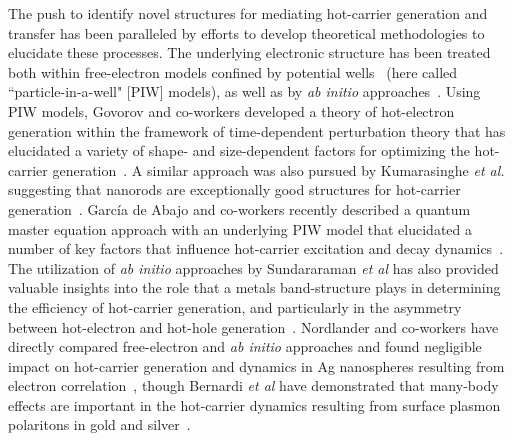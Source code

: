 \documentclass[journal=jpclcd,manuscript=letter]{achemso}
\begin{document}
The push to identify novel structures for mediating hot-carrier generation and transfer has been paralleled by 
efforts to develop theoretical methodologies to elucidate these processes.  The underlying electronic
structure has been treated both within free-electron models confined by potential wells~\cite{GZG_JPCC_2013,ZG_JPCC_2014,MLK_ACSNano_2014,KPB_SciRep_2015,SAG_ACSPhotonics_2016} (here called
``particle-in-a-well" [PIW] models), as well as by {\it ab initio} approaches~\cite{SNJ_NatComm_2014,BMN_NatComm_2015,MWW_NatComm_2015,BSN_ACSNano_2016}.
Using PIW models, Govorov and co-workers developed a theory of 
hot-electron generation within the framework of time-dependent perturbation theory that
has elucidated a variety of shape- and size-dependent factors for optimizing 
the hot-carrier generation~\cite{GZG_JPCC_2013,ZG_JPCC_2014}.  A similar approach was also pursued by Kumarasinghe {\it et al.} suggesting
that nanorods are exceptionally good structures for hot-carrier generation~\cite{KPB_SciRep_2015}.  Garc\'ia de Abajo and co-workers recently described a 
quantum master equation approach with an underlying PIW model that elucidated a number of key factors that influence
hot-carrier excitation and decay dynamics~\cite{SAG_ACSPhotonics_2016}.  The utilization of {\it ab initio} approaches by Sundararaman {\it et al} 
has also provided valuable insights into the role that a metals band-structure plays
in determining the efficiency of hot-carrier generation, and particularly in the asymmetry between hot-electron
and hot-hole generation~\cite{SNJ_NatComm_2014}.  Nordlander and co-workers have directly compared free-electron and {\it ab initio} approaches
and found negligible impact on hot-carrier generation and dynamics in Ag nanospheres resulting from electron correlation~\cite{MLK_ACSNano_2014}, 
though Bernardi {\it et al} have demonstrated that many-body effects are important in the hot-carrier dynamics resulting
from surface plasmon polaritons in gold and silver~\cite{BMN_NatComm_2015}.
\end{document}
